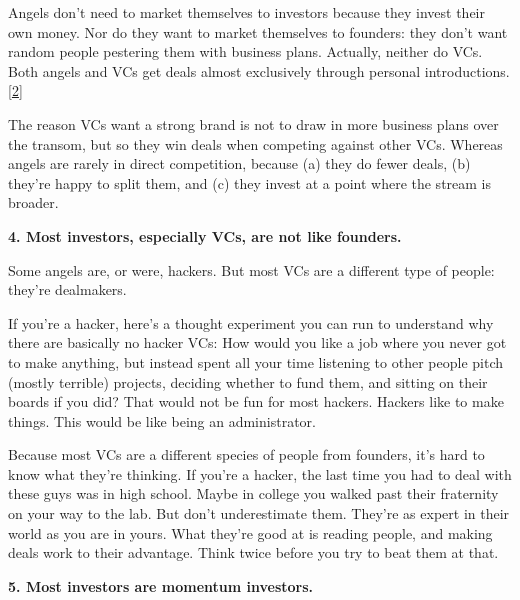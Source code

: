 Angels don't
                  need to market themselves to investors because they invest
                  their own money. Nor do they want to market themselves to
                  founders: they don't want random people pestering them with
                  business plans. Actually, neither do VCs. Both angels and VCs
                  get deals almost exclusively through personal introductions.
                  [\href{\#f2n}{2}]

The reason VCs want a strong brand is not to draw
                  in more business plans over the transom, but so they win deals
                  when competing against other VCs. Whereas angels are rarely in
                  direct competition, because (a) they do fewer deals, (b)
                  they're happy to split them, and (c) they invest at a point
                  where the stream is broader.

\textbf{4. Most investors, especially VCs, are not like
                    founders.}

Some angels are, or were, hackers. But most VCs
                  are a different type of people: they're dealmakers.

If
                  you're a hacker, here's a thought experiment you can run to
                  understand why there are basically no hacker VCs: How would
                  you like a job where you never got to make anything, but
                  instead spent all your time listening to other people pitch
                  (mostly terrible) projects, deciding whether to fund them, and
                  sitting on their boards if you did? That would not be fun for
                  most hackers. Hackers like to make things. This would be like
                  being an administrator.

Because most VCs are a
                  different species of people from founders, it's hard to know
                  what they're thinking. If you're a hacker, the last time you
                  had to deal with these guys was in high school. Maybe in
                  college you walked past their fraternity on your way to the
                  lab. But don't underestimate them. They're as expert in their
                  world as you are in yours. What they're good at is reading
                  people, and making deals work to their advantage. Think twice
                  before you try to beat them at that.

\textbf{5. Most investors are momentum investors.}

